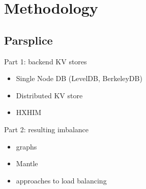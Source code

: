 \section{Methodology}

\subsection{Parsplice}

Part 1: backend KV stores
\begin{itemize}
  \item Single Node DB (LevelDB, BerkeleyDB)
  \item Distributed KV store
  \item HXHIM
\end{itemize}

Part 2: resulting imbalance
\begin{itemize}
  \item graphs
  \item Mantle
  \item approaches to load balancing
\end{itemize}



